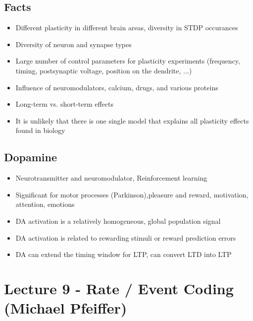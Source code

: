 \documentclass[english,11pt]{article}
\begin{document}
\subsection{Facts}
\begin{itemize}
\item Different plasticity in different brain areas, diversity in STDP occurances
\item Diversity of neuron and synapse types
\item Large number of control parameters for plasticity experiments (frequency, timing, postsynaptic voltage, position on the dendrite, ...)
\item Influence of neuromodulators, calcium, drugs, and various proteins
\item Long-term vs. short-term effects
\item It is unlikely that there is one single model that explains all plasticity effects found in biology
\end{itemize}

\subsection{Dopamine}
\begin{itemize}
\item Neurotransmitter and neuromodulator, Reinforcement learning
\item Significant for motor processes (Parkinson),pleasure and reward, motivation, attention, emotions
\item DA activation is a relatively
homogeneous, global population signal
\item DA activation is related to rewarding stimuli or reward prediction errors
\item DA can extend
the timing window for LTP, can convert LTD into LTP
\end{itemize}









\section{Lecture 9 - Rate / Event Coding (Michael Pfeiffer)}

\end{document}
